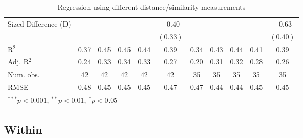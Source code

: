 \documentclass[]{article}
\begin{document}
\begin{landscape}
\begin{table}
\begin{center}
\begin{tabular}{l c c c c c c c c c c }
\quad Sized Difference (D) &             &              &             &              & $-0.40$     &             &              &             &             & $-0.63$     \\
                           &             &              &             &              & $(0.33)$    &             &              &             &             & $(0.40)$    \\
\hline
R$^2$                      & 0.37        & 0.45         & 0.45        & 0.44         & 0.39        & 0.34        & 0.43         & 0.44        & 0.41        & 0.39        \\
Adj. R$^2$                 & 0.24        & 0.33         & 0.34        & 0.33         & 0.27        & 0.20        & 0.31         & 0.32        & 0.28        & 0.26        \\
Num. obs.                  & 42          & 42           & 42          & 42           & 42          & 35          & 35           & 35          & 35          & 35          \\
RMSE                       & 0.48        & 0.45         & 0.45        & 0.45         & 0.47        & 0.47        & 0.44         & 0.44        & 0.45        & 0.45        \\
\hline
\multicolumn{11}{l}{\scriptsize{$^{***}p<0.001$, $^{**}p<0.01$, $^*p<0.05$}}
\end{tabular}
\caption{Regression using different distance/similarity measurements}
\label{table:coefficients}
\end{center}
\end{table}

\end{landscape}

\clearpage

\normalsize

\hypertarget{within}{%
\subsection{Within}\label{within}}

\clearpage
\end{document}
